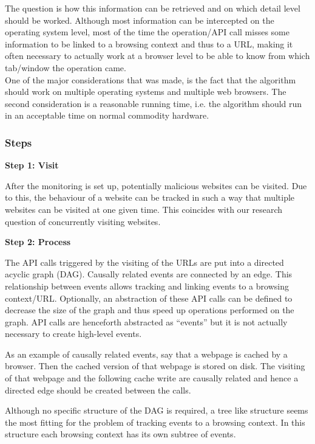 The question is how this information can be retrieved and on which detail level should be worked. Although most information can be intercepted on the operating system level, most of the time the operation/API call misses some information to be linked to a browsing context and thus to a URL, making it often necessary to actually work at a browser level to be able to know from which tab/window the operation came.\\%

One of the major considerations that was made, is the fact that the algorithm should work on multiple operating systems and multiple web browsers. The second consideration is a reasonable running time, i.e. the algorithm should run in an acceptable time on normal commodity hardware.

\subsubsection{Steps}

\textbf{Step 1: Visit}

After the monitoring is set up, potentially malicious websites can be visited. Due to this, the behaviour of a website can be tracked in such a way that multiple websites can be visited at one given time. This coincides with our research question of concurrently visiting websites.

\textbf{Step 2: Process}
\label{sec:algos2}

The API calls triggered by the visiting of the URLs are put into a directed acyclic graph (DAG). Causally related events are connected by an edge. This relationship between events allows tracking and linking events to a browsing context/URL. Optionally, an abstraction of these API calls can be defined to decrease the size of the graph and thus speed up operations performed on the graph. API calls are henceforth abstracted as ``events'' but it is not actually necessary to create high-level events.

As an example of causally related events, say that a webpage is cached by a browser. Then the cached version of that webpage is stored on disk. The visiting of that webpage and the following cache write are causally related and hence a directed edge should be created between the calls.

Although no specific structure of the DAG is required, a tree like structure seems the most fitting for the problem of tracking events to a browsing context. In this structure each browsing context has its own subtree of events. 

